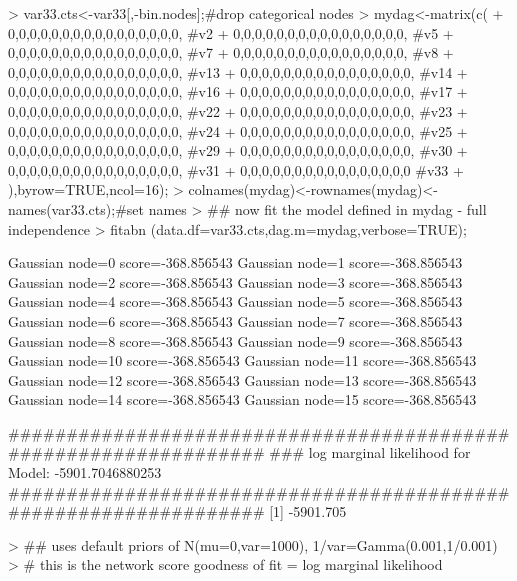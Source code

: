 \documentclass[nojss]{jss}
\begin{document}
\begin{Schunk}
\begin{Sinput}
> var33.cts<-var33[,-bin.nodes];#drop categorical nodes
> mydag<-matrix(c(
+                  0,0,0,0,0,0,0,0,0,0,0,0,0,0,0,0, #v2
+                  0,0,0,0,0,0,0,0,0,0,0,0,0,0,0,0, #v5  
+                  0,0,0,0,0,0,0,0,0,0,0,0,0,0,0,0, #v7  
+                  0,0,0,0,0,0,0,0,0,0,0,0,0,0,0,0, #v8 
+                  0,0,0,0,0,0,0,0,0,0,0,0,0,0,0,0, #v13  
+                  0,0,0,0,0,0,0,0,0,0,0,0,0,0,0,0, #v14  
+                  0,0,0,0,0,0,0,0,0,0,0,0,0,0,0,0, #v16  
+                  0,0,0,0,0,0,0,0,0,0,0,0,0,0,0,0, #v17  
+                  0,0,0,0,0,0,0,0,0,0,0,0,0,0,0,0, #v22 
+                  0,0,0,0,0,0,0,0,0,0,0,0,0,0,0,0, #v23
+                  0,0,0,0,0,0,0,0,0,0,0,0,0,0,0,0, #v24 
+                  0,0,0,0,0,0,0,0,0,0,0,0,0,0,0,0, #v25 
+                  0,0,0,0,0,0,0,0,0,0,0,0,0,0,0,0, #v29 
+                  0,0,0,0,0,0,0,0,0,0,0,0,0,0,0,0, #v30 
+                  0,0,0,0,0,0,0,0,0,0,0,0,0,0,0,0, #v31 
+                  0,0,0,0,0,0,0,0,0,0,0,0,0,0,0,0  #v33 
+               ),byrow=TRUE,ncol=16); 
> colnames(mydag)<-rownames(mydag)<-names(var33.cts);#set names
> ## now fit the model defined in mydag - full independence
> fitabn (data.df=var33.cts,dag.m=mydag,verbose=TRUE);
\end{Sinput}
\begin{Soutput}
Gaussian node=0 score=-368.856543
Gaussian node=1 score=-368.856543
Gaussian node=2 score=-368.856543
Gaussian node=3 score=-368.856543
Gaussian node=4 score=-368.856543
Gaussian node=5 score=-368.856543
Gaussian node=6 score=-368.856543
Gaussian node=7 score=-368.856543
Gaussian node=8 score=-368.856543
Gaussian node=9 score=-368.856543
Gaussian node=10 score=-368.856543
Gaussian node=11 score=-368.856543
Gaussian node=12 score=-368.856543
Gaussian node=13 score=-368.856543
Gaussian node=14 score=-368.856543
Gaussian node=15 score=-368.856543

   #################################################################
   ###      log marginal likelihood for Model: -5901.7046880253
   #################################################################
[1] -5901.705
\end{Soutput}
\begin{Sinput}
> ## uses default priors of N(mu=0,var=1000), 1/var=Gamma(0.001,1/0.001)
> # this is the network score goodness of fit = log marginal likelihood
\end{Sinput}
\end{Schunk}
\end{document}
